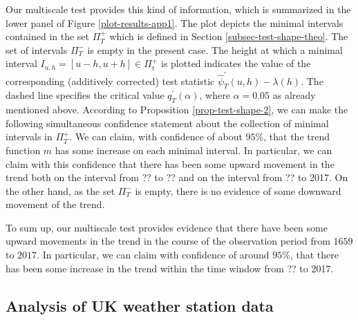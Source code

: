 Our multiscale test provides this kind of information, which is summarized in the lower panel of Figure \ref{plot-results-app1}. The plot depicts the minimal intervals contained in the set $\Pi_T^+$ which is defined in Section \ref{subsec-test-shape-theo}. The set of intervals $\Pi_T^-$ is empty in the present case. The height at which a minimal interval $I_{u,h} = [u-h,u+h] \in \Pi_t^+$ is plotted indicates the value of the corresponding (additively corrected) test statistic $\widehat{\psi}^\prime_T(u,h) - \lambda(h)$. The dashed line specifies the critical value $q_T^\prime(\alpha)$, where $\alpha = 0.05$ as already mentioned above. According to Proposition \ref{prop-test-shape-2}, we can make the following simultaneous confidence statement about the collection of minimal intervals in $\Pi_T^+$. We can claim, with confidence of about $95\%$, that the trend function $m$ has some increase on each minimal interval. In particular, we can claim with this confidence that there has been some upward movement in the trend both on the interval from ?? to ?? and on the interval from ?? to 2017. 
On the other hand, as the set $\Pi_T^-$ is empty, there is no evidence of some downward movement of the trend.  


To sum up, our multiscale test provides evidence that there have been some upward movements in the trend in the course of the observation period from $1659$ to $2017$. In particular, we can claim with confidence of around $95\%$, that there has been some increase in the trend within the time window from ?? to 2017. 




\subsection{Analysis of UK weather station data}
